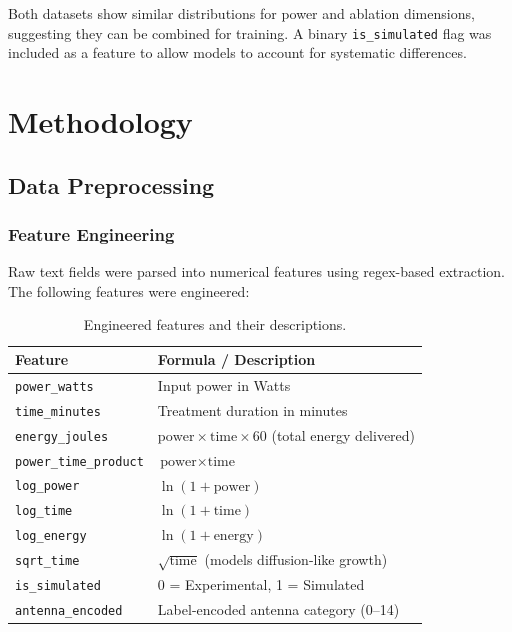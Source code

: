 \documentclass[12pt, a4paper]{article}
\begin{document}
Both datasets show similar distributions for power and ablation dimensions, suggesting they can be combined for training. A binary \texttt{is\_simulated} flag was included as a feature to allow models to account for systematic differences.

\section{Methodology}
\label{sec:methodology}

\subsection{Data Preprocessing}
\label{sec:preprocessing}

\subsubsection{Feature Engineering}
\label{sec:feature-engineering}

Raw text fields were parsed into numerical features using regex-based extraction. The following features were engineered:

\begin{table}[H]
\centering
\caption{Engineered features and their descriptions.}
\label{tab:features}
\begin{tabular}{@{}ll@{}}
\toprule
\textbf{Feature} & \textbf{Formula / Description} \\
\midrule
\texttt{power\_watts}         & Input power in Watts \\
\texttt{time\_minutes}        & Treatment duration in minutes \\
\texttt{energy\_joules}       & $\text{power} \times \text{time} \times 60$ (total energy delivered) \\
\texttt{power\_time\_product} & $\text{power} \times \text{time}$ \\
\texttt{log\_power}           & $\ln(1 + \text{power})$ \\
\texttt{log\_time}            & $\ln(1 + \text{time})$ \\
\texttt{log\_energy}          & $\ln(1 + \text{energy})$ \\
\texttt{sqrt\_time}           & $\sqrt{\text{time}}$ (models diffusion-like growth) \\
\texttt{is\_simulated}        & 0 = Experimental, 1 = Simulated \\
\texttt{antenna\_encoded}     & Label-encoded antenna category (0--14) \\
\bottomrule
\end{tabular}
\end{table}
\end{document}
